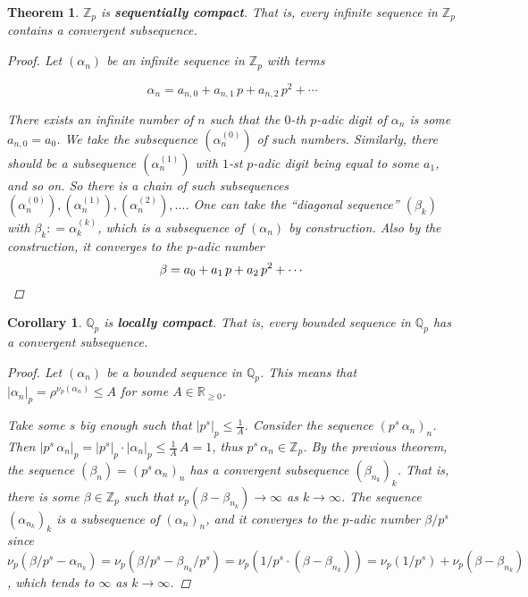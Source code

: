 \documentclass{article}
\newcommand{\term}{\textbf}
\newcommand{\dfn}{\mathrel{\mathop:}=}
\newcommand{\ZZ}{\mathbb{Z}}
\newcommand{\QQ}{\mathbb{Q}}
\theoremstyle{myplain}
\newtheorem{theorem}[proposition]{Theorem}
\newtheorem{corollary}[proposition]{Corollary}
\theoremstyle{mydefinition}
\begin{document}
\begin{theorem}
  $\ZZ_p$ is \term{sequentially compact}. That is, every infinite sequence in
  $\ZZ_p$ contains a convergent subsequence.

  \begin{proof}
    Let $(\alpha_n)$ be an infinite sequence in $\ZZ_p$ with terms

    \[ \alpha_n = a_{n,0} + a_{n,1}\,p + a_{n,2}\,p^2 + \cdots \]

    There exists an infinite number of $n$ such that the $0$-th $p$-adic digit
    of $\alpha_n$ is some $a_{n,0} = a_0$. We take the subsequence
    $(\alpha_n^{(0)})$ of such numbers. Similarly, there should be a subsequence
    $(\alpha_n^{(1)})$ with $1$-st $p$-adic digit being equal to some $a_1$, and
    so on. So there is a chain of such subsequences
    $(\alpha_n^{(0)}), (\alpha_n^{(1)}), (\alpha_n^{(2)}), \ldots$. One can take
    the ``diagonal sequence'' $(\beta_k)$ with $\beta_k \dfn \alpha_k^{(k)}$,
    which is a subsequence of $(\alpha_n)$ by construction. Also by
    the construction, it converges to the $p$-adic number
    \[ \beta = a_0 + a_1\,p + a_2\,p^2 + \cdots \qedhere \]
  \end{proof}
\end{theorem}

\begin{corollary}
  $\QQ_p$ is \term{locally compact}. That is, every bounded sequence in $\QQ_p$
  has a convergent subsequence.

  \begin{proof}
    Let $(\alpha_n)$ be a bounded sequence in $\QQ_p$. This means that
    $|\alpha_n|_p = \rho^{ \nu_p (\alpha_n)} \le A$ for some
    $A \in \mathbb{R}_{\ge 0}$.

    Take some $s$ big enough such that $|p^s|_p \le \frac{1}{A}$. Consider the
    sequence $(p^s \, \alpha_n)_n$. Then
    $|p^s \, \alpha_n|_p = |p^s|_p \cdot |\alpha_n|_p \le \frac{1}{A}\,A = 1$,
    thus $p^s \, \alpha_n \in \ZZ_p$. By the previous theorem, the sequence
    $(\beta_n) = (p^s \, \alpha_n)_n$ has a convergent subsequence
    $(\beta_{n_k})_k$. That is, there is some $\beta \in \ZZ_p$ such that
    $ \nu_p (\beta - \beta_{n_k}) \to \infty$ as $k \to \infty$. The sequence
    $(\alpha_{n_k})_k$ is a subsequence of $(\alpha_n)_n$, and it converges to
    the $p$-adic number $\beta / p^s$ since
    $\nu_p (\beta/p^s - \alpha_{n_k}) = \nu_p (\beta/p^s - \beta_{n_k}/p^s) =
    \nu_p (1/p^s \cdot (\beta - \beta_{n_k})) =
    \nu_p (1/p^s) + \nu_p (\beta - \beta_{n_k})$,
    which tends to $\infty$ as $k \to \infty$.
  \end{proof}
\end{corollary}
\end{document}
